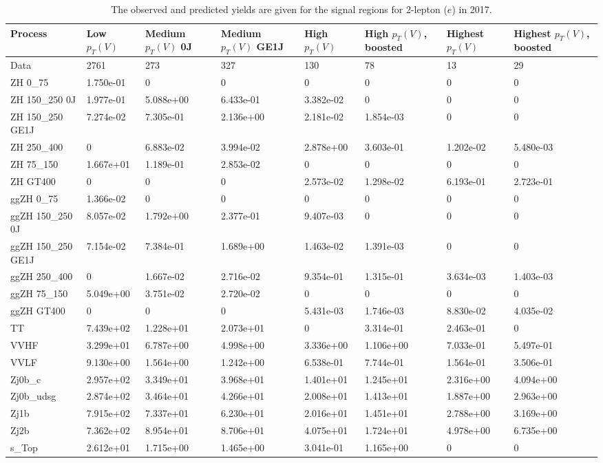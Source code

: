 \begin{table}
\centering
\caption[2017 2-lepton ($e$) signal selection yields]{
                  The observed and predicted yields are given for the
                  signal regions for 2-lepton ($e$) in 2017.
                  }
{\footnotesize
\begin{tabularx}{\textwidth}{|X|X|X|X|X|X|X|X|}
\hline
Process & Low $p_{T}(V)$ & Medium $p_{T}(V)$ 0J & Medium $p_{T}(V)$ GE1J & High $p_{T}(V)$ & High $p_{T}(V)$, boosted & Highest $p_{T}(V)$ & Highest $p_{T}(V)$, boosted \\
\hline
Data & 2761 & 273 & 327 & 130 & 78 & 13 & 29 \\
\hline
ZH 0\_75 & 1.750e-01 & 0 & 0 & 0 & 0 & 0 & 0 \\
ZH 150\_250 0J & 1.977e-01 & 5.088e+00 & 6.433e-01 & 3.382e-02 & 0 & 0 & 0 \\
ZH 150\_250 GE1J & 7.274e-02 & 7.305e-01 & 2.136e+00 & 2.181e-02 & 1.854e-03 & 0 & 0 \\
ZH 250\_400 & 0 & 6.883e-02 & 3.994e-02 & 2.878e+00 & 3.603e-01 & 1.202e-02 & 5.480e-03 \\
ZH 75\_150 & 1.667e+01 & 1.189e-01 & 2.853e-02 & 0 & 0 & 0 & 0 \\
ZH GT400 & 0 & 0 & 0 & 2.573e-02 & 1.298e-02 & 6.193e-01 & 2.723e-01 \\
ggZH 0\_75 & 1.366e-02 & 0 & 0 & 0 & 0 & 0 & 0 \\
ggZH 150\_250 0J & 8.057e-02 & 1.792e+00 & 2.377e-01 & 9.407e-03 & 0 & 0 & 0 \\
ggZH 150\_250 GE1J & 7.154e-02 & 7.384e-01 & 1.689e+00 & 1.463e-02 & 1.391e-03 & 0 & 0 \\
ggZH 250\_400 & 0 & 1.667e-02 & 2.716e-02 & 9.354e-01 & 1.315e-01 & 3.634e-03 & 1.403e-03 \\
ggZH 75\_150 & 5.049e+00 & 3.751e-02 & 2.720e-02 & 0 & 0 & 0 & 0 \\
ggZH GT400 & 0 & 0 & 0 & 5.431e-03 & 1.746e-03 & 8.830e-02 & 4.035e-02 \\
\hline
TT & 7.439e+02 & 1.228e+01 & 2.073e+01 & 0 & 3.314e-01 & 2.463e-01 & 0 \\
VVHF & 3.299e+01 & 6.787e+00 & 4.998e+00 & 3.336e+00 & 1.106e+00 & 7.033e-01 & 5.497e-01 \\
VVLF & 9.130e+00 & 1.564e+00 & 1.242e+00 & 6.538e-01 & 7.744e-01 & 1.564e-01 & 3.506e-01 \\
Zj0b\_c & 2.957e+02 & 3.349e+01 & 3.968e+01 & 1.401e+01 & 1.245e+01 & 2.316e+00 & 4.094e+00 \\
Zj0b\_udsg & 2.874e+02 & 3.464e+01 & 4.266e+01 & 2.008e+01 & 1.413e+01 & 1.887e+00 & 2.963e+00 \\
Zj1b & 7.915e+02 & 7.337e+01 & 6.230e+01 & 2.016e+01 & 1.451e+01 & 2.788e+00 & 3.169e+00 \\
Zj2b & 7.362e+02 & 8.954e+01 & 8.706e+01 & 4.075e+01 & 1.724e+01 & 4.978e+00 & 6.735e+00 \\
s\_Top & 2.612e+01 & 1.715e+00 & 1.465e+00 & 3.041e-01 & 1.165e+00 & 0 & 0 \\
\hline
\end{tabularx}
}
\label{tab:sr-Zee-2017}
\end{table}

